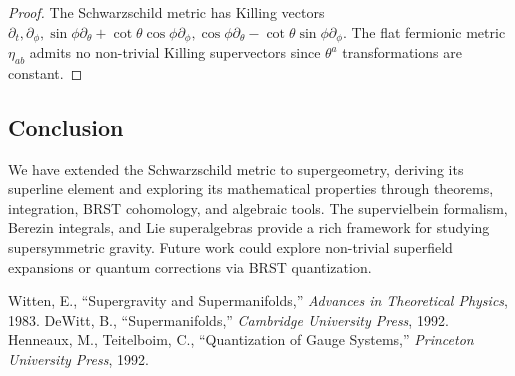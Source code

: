 \documentclass{article}
\theoremstyle{plain}
\begin{document}
\begin{proof}
The Schwarzschild metric has Killing vectors $\partial_{t}, \partial_{\phi}, \sin\phi \partial_{\theta} + \cot\theta \cos\phi \partial_{\phi}, \cos\phi \partial_{\theta} - \cot\theta \sin\phi \partial_{\phi}$. The flat fermionic metric $\eta_{ab}$ admits no non-trivial Killing supervectors since $\theta^{a}$ transformations are constant.
\end{proof}

\subsection{Conclusion}

We have extended the Schwarzschild metric to supergeometry, deriving its superline element and exploring its mathematical properties through theorems, integration, BRST cohomology, and algebraic tools. The supervielbein formalism, Berezin integrals, and Lie superalgebras provide a rich framework for studying supersymmetric gravity. Future work could explore non-trivial superfield expansions or quantum corrections via BRST quantization.

\begin{thebibliography}{9}
  Witten, E., ``Supergravity and Supermanifolds,'' \emph{Advances in Theoretical Physics}, 1983.
  DeWitt, B., ``Supermanifolds,'' \emph{Cambridge University Press}, 1992.
  Henneaux, M., Teitelboim, C., ``Quantization of Gauge Systems,'' \emph{Princeton University Press}, 1992.
\end{thebibliography}
\end{document}
